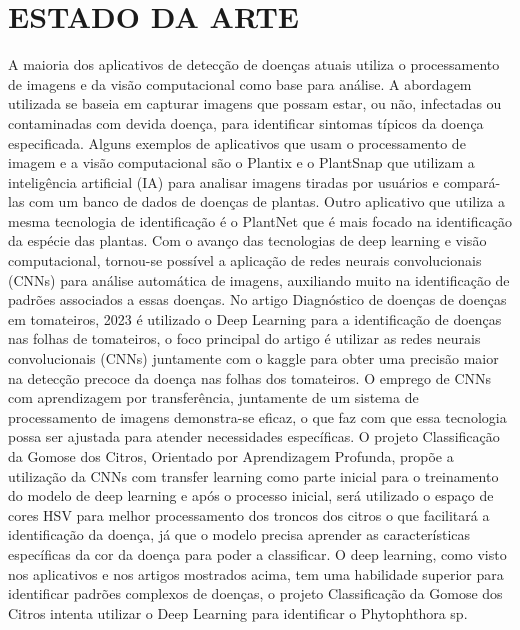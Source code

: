 \documentclass[
  a4paper,%
  12pt,%
  english,%
  brazilian,%
]{article}
\begin{document}
\section*{ESTADO DA ARTE}A maioria dos aplicativos de detecção de doenças atuais utiliza o processamento de imagens e da visão computacional como base para análise. A abordagem utilizada se baseia em capturar imagens que possam estar, ou não, infectadas ou contaminadas com devida doença, para identificar sintomas típicos da doença especificada. 
Alguns exemplos de aplicativos que usam o processamento de imagem e a visão computacional são o Plantix \cite{plantix} e o PlantSnap \cite{plantsnap} que utilizam a inteligência artificial (IA) para analisar imagens tiradas por usuários e compará-las com um banco de dados de doenças de plantas. Outro aplicativo que utiliza a mesma tecnologia de identificação é o PlantNet \cite{plantnet} que é mais focado na identificação da espécie das plantas. Com o avanço das tecnologias de deep learning e visão computacional, tornou-se possível a aplicação de redes neurais convolucionais (CNNs) para análise automática de imagens, auxiliando muito na identificação de padrões associados a essas doenças. No artigo Diagnóstico de doenças de doenças em tomateiros, 2023 \cite{viana2023diagnostico} é utilizado o Deep Learning para a identificação de doenças nas folhas de tomateiros, o foco principal do artigo é utilizar as redes neurais convolucionais (CNNs) juntamente com o kaggle para obter uma precisão maior na detecção precoce da doença nas folhas dos tomateiros. O emprego de CNNs com aprendizagem por transferência, juntamente de um sistema de processamento de imagens demonstra-se eficaz, o que faz com que essa tecnologia possa ser ajustada para atender necessidades específicas. O projeto Classificação da Gomose dos Citros, Orientado por Aprendizagem Profunda, propõe a utilização da CNNs com transfer learning como parte inicial para o treinamento do modelo de deep learning e após o processo inicial, será utilizado o espaço de cores HSV para melhor processamento dos troncos dos citros o que facilitará a identificação da doença, já que o modelo precisa aprender as características específicas da cor da doença para poder a classificar. O deep learning, como visto nos aplicativos e nos artigos mostrados acima, tem uma habilidade superior para identificar padrões complexos de doenças, o projeto Classificação da Gomose dos Citros intenta utilizar o Deep Learning para identificar o Phytophthora sp.
 \label{sect:estadoarte}


\end{document}
